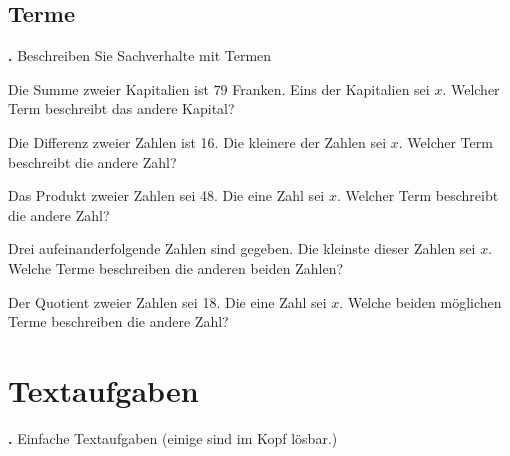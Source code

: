 \newpage

\subsection{Terme}

\textbf{\bbwAufgabenNummer{}.}
Beschreiben Sie Sachverhalte mit Termen


\begin{bbwAufgabenBlock}
\item Die Summe zweier Kapitalien ist $79$ Franken. Eins der
Kapitalien sei $x$. Welcher Term
beschreibt das andere Kapital?


\item Die Differenz zweier Zahlen ist 16. Die kleinere der Zahlen sei
$x$. Welcher Term beschreibt die andere Zahl?



\item Das Produkt zweier Zahlen sei 48. Die eine Zahl sei $x$. Welcher
Term beschreibt die andere Zahl?


\item Drei aufeinanderfolgende Zahlen sind gegeben. Die kleinste
dieser Zahlen sei $x$. Welche Terme beschreiben die anderen beiden
Zahlen?


\item Der Quotient zweier Zahlen sei 18. Die eine Zahl sei $x$. Welche
beiden möglichen Terme beschreiben die andere Zahl?


\end{bbwAufgabenBlock}

\newpage

\section{Textaufgaben}

\textbf{\bbwAufgabenNummer{}.}
Einfache Textaufgaben (einige sind im Kopf lösbar.)

